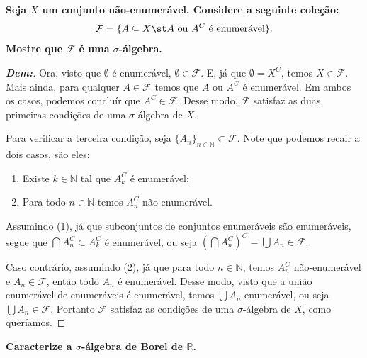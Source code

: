 \bigline
\textbf{Seja $X$ um conjunto não-enumerável. Considere a seguinte coleção:
$$\mathcal F = 
\{A \subseteq X \st  A \text{ ou } A^C \text{ é enumerável}\}.$$ 
  Mostre que $\mathcal F$ é uma $\sigma$-álgebra.}
\begin{proof}[\textbf{Dem:}]
 Ora, visto que $\emptyset$ é enumerável, $\emptyset \in \mathcal F$. 
E, já que $\emptyset = X^C$, temos $X \in \mathcal F$. Mais ainda,
para qualquer $A \in \mathcal F$ temos que $A$ ou $A^C$ é enumerável. 
Em ambos os casos, podemos concluír que $A^C \in \mathcal F$. Desse modo, $\mathcal F$ 
satisfaz as duas primeiras condições de uma $\sigma$-álgebra de $X$.

Para verificar a terceira condição, seja 
$\{A_n\}_{n \in \mathbb N} \subset \mathcal F$. Note que 
podemos recair a dois casos, são eles:
\begin{enumerate}
  \item Existe $k \in \mathbb N$ tal que $A_k^C$ é enumerável;
  \item Para todo $n \in \mathbb N$ temos $A_n^C$ não-enumerável. 
\end{enumerate}

Assumindo (1), já que subconjuntos de conjuntos enumeráveis são 
enumeráveis, segue que $\bigcap A_n^C \subset A_k^C$ é enumerável, ou seja 
$\left(\bigcap A_n^C\right)^C = \bigcup A_n \in \mathcal F$. 

Caso contrário, assumindo (2), já que para todo $n \in \mathbb N$, 
temos $A_n^C$ não-enumerável e $A_n \in \mathcal F$, então todo $A_n$ é enumerável.
Desse modo, visto que a união enumerável de enumeráveis é enumerável, temos 
$\bigcup A_n$ enumerável, ou seja $\bigcup A_n \in \mathcal F$. Portanto 
$\mathcal F$ satisfaz as condições de uma $\sigma$-álgebra de $X$, 
como queríamos. 
\end{proof}
\biglinend
\newpage
{}
\bigline
\textbf{Caracterize a $\sigma$-álgebra de Borel de $\mathbb R$.}
\noindent\textbf{} 
